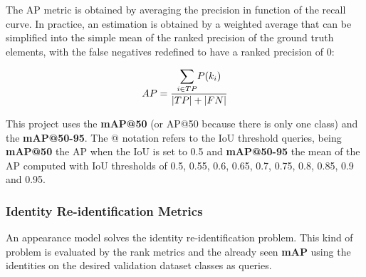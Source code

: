 


{
    The \ac{AP} metric is obtained by averaging the precision in function of the recall curve. In practice, an estimation is obtained by a weighted average that can be simplified into the simple mean of the ranked precision of the ground truth elements, with the false negatives redefined to have a ranked precision of 0:
}

\begin{equation}
    \label{eqn:AP real}
    AP = \frac{\mathlarger{\sum\limits_{i \in TP}} P(k_{i})}{|TP| + |FN|}
\end{equation}

{
    This project uses the \textbf{\ac{mAP}@50} (or \ac{AP}@50 because there is only one class) and the \textbf{\ac{mAP}@50-95}. 
    The @ notation refers to the \ac{IoU} threshold queries, being \textbf{\ac{mAP}@50} the \ac{AP} when the \ac{IoU} is set to 0.5 and \textbf{\ac{mAP}@50-95} the mean of the \ac{AP} computed with \ac{IoU} thresholds of 0.5, 0.55, 0.6, 0.65, 0.7, 0.75, 0.8, 0.85, 0.9 and 0.95.
}

\subsubsection{Identity Re-identification Metrics}

{
    An appearance model solves the identity re-identification problem. 
    This kind of problem is evaluated by the rank metrics and the already seen \textbf{\ac{mAP}} using the identities on the desired validation dataset classes as queries.
}

